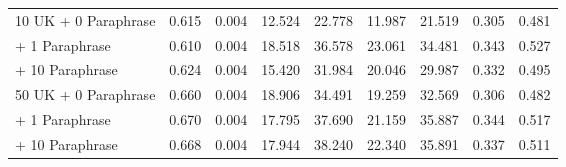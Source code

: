 \begin{table*}[!ht]
\begin{tabular}{l|cc|cccccc}
\hspace{1.5ex} 10 UK\hspace{1.2ex} + \hspace{1.5ex} 0 Paraphrase    & 0.615                                 & 0.004                                & 12.524                            & 22.778                               & 11.987                               & 21.519                               & 0.305                                & 0.481                                \\
 \hspace{9.3ex} + \hspace{1.5ex} 1 Paraphrase     & 0.610                                 & 0.004                                & 18.518                            & 36.578                               & 23.061                               & 34.481                               & 0.343                                & 0.527                                \\
 \hspace{9.3ex} + \hspace{0.5ex} 10 Paraphrase  & 0.624                                 & 0.004                                & 15.420                            & 31.984                               & 20.046                               & 29.987                               & 0.332                                & 0.495                                \\
\hspace{1.5ex} 50 UK\hspace{1.2ex} + \hspace{1.5ex} 0 Paraphrase    & 0.660                                 & 0.004                                & 18.906                            & 34.491                               & 19.259                               & 32.569                               & 0.306                                & 0.482                                \\
 \hspace{9.3ex} + \hspace{1.5ex} 1 Paraphrase   & 0.670                                 & 0.004                                & 17.795                            & 37.690                               & 21.159                               & 35.887                               & 0.344                                & 0.517                                \\
 \hspace{9.3ex} + \hspace{0.5ex} 10 Paraphrase  & 0.668                                 & 0.004                                & 17.944                            & 38.240                               & 22.340                               & 35.891                               & 0.337                                & 0.511                                \\

\end{tabular}
\end{table*}
